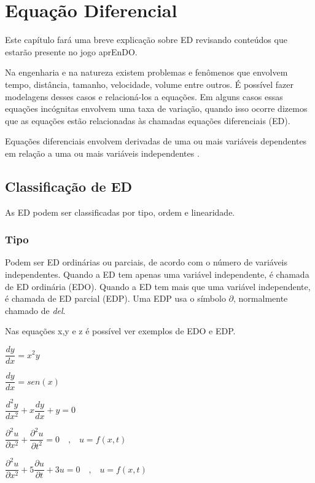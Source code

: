 \chapter[Equação diferencial]{Equação Diferencial}
Este capítulo fará uma breve explicação sobre ED revisando conteúdos que estarão presente no jogo aprEnDO.

Na engenharia e na natureza existem problemas e fenômenos que envolvem tempo, distância, tamanho, velocidade, volume entre outros. É possível fazer modelagens desses casos e relacioná-los a equações. Em alguns casos essas equações incógnitas envolvem uma taxa de variação, quando isso ocorre dizemos que as equações estão relacionadas às chamadas equações diferenciais (ED).

Equações diferenciais envolvem derivadas de uma ou mais variáveis dependentes em relação a uma ou mais variáveis independentes \cite{explicacaoEDO}.

\section[Classificação de ED]{Classificação de ED}

As ED podem ser classificadas por tipo, ordem e linearidade.

\subsection[Tipo]{Tipo}

Podem ser ED ordinárias ou parciais, de acordo com o número de variáveis independentes. Quando a ED tem apenas uma variável independente, é chamada de ED ordinária (EDO). Quando a ED tem mais que uma variável independente, é chamada de ED parcial (EDP).
Uma EDP usa o símbolo $ \partial $, normalmente chamado de \textit{del}.

Nas equações x,y e z é possível ver exemplos de EDO e EDP.


  $
\dfrac{dy}{dx} = x^2y
$
  
  
$
\dfrac{dy}{dx} = sen(x)
$


  
$
\dfrac{d^2y}{dx^2} + x \dfrac{dy}{dx} + y = 0
$ 


$
\dfrac{\partial ^2u}{\partial x^2} + \dfrac{\partial ^2u}{\partial t^2} = 0  \quad \textrm{,} \quad  u = f(x,t)
$

$
\dfrac{\partial^2u}{\partial x^2} + 5 \dfrac{\partial u}{\partial t} + 3u = 0 \quad \textrm{,} \quad   u = f(x,t)
$


